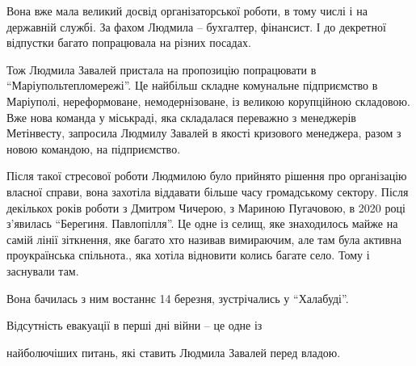 

Вона вже мала великий досвід організаторської роботи, в тому числі і на
державній службі. За фахом Людмила – бухгалтер, фінансист. І до декретної
відпустки багато попрацювала на різних посадах.



Тож Людмила Завалей пристала на пропозицію попрацювати в
\enquote{Маріупольтепломережі}. Це найбільш складне комунальне підприємство в
Маріуполі, нереформоване, немодернізоване, із великою корупційною складовою.
Вже нова команда у міськраді, яка складалася переважно з менеджерів Метінвесту,
запросила Людмилу Завалей в якості кризового менеджера, разом з новою командою,
на підприємство.



Після такої стресової роботи Людмилою було прийнято рішення про організацію
власної справи, вона захотіла віддавати більше часу громадському сектору. Після
декількох років роботи з Дмитром Чичерою, з Мариною Пугачовою, в 2020 році
з'явилась \enquote{Берегиня. Павлопілля}. Це одне із селищ, яке знаходилось майже на
самій лінії зіткнення, яке багато хто називав вимираючим, але там була активна
проукраїнська спільнота., яка хотіла відновити колись багате село. Тому і
заснували там.



Вона бачилась з ним востаннє 14 березня, зустрічались у \enquote{Халабуді}.


Відсутність евакуації в перші дні війни – це одне із\par\noindent найболючіших питань, які
ставить Людмила Завалей перед владою.
 
